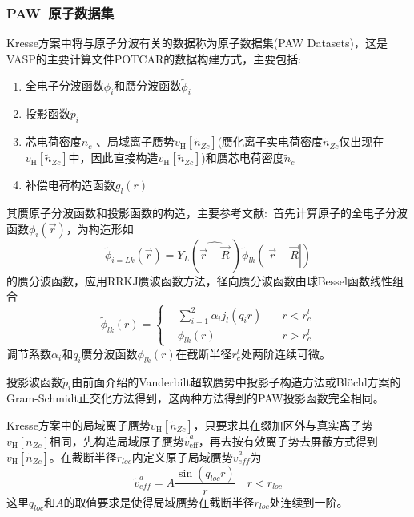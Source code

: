 \subsubsection{\rm{PAW~}原子数据集}
\textrm{Kresse}方案中将与原子分波有关的数据称为原子数据集(\textrm{PAW Datasets})，这是\textrm{VASP}的主要计算文件\textrm{POTCAR}的数据构建方式，主要包括:~
\begin{enumerate}
	\item 全电子分波函数$\phi_i$和赝分波函数$\tilde\phi_i$
	\item 投影函数$\tilde p_i$
	\item 芯电荷密度$n_c$ 、局域离子赝势$v_{\mathrm H}[\tilde n_{Zc}]$(赝化离子实电荷密度$\tilde n_{Zc}$仅出现在$v_{\mathrm H}[\tilde n_{Zc}]$中，因此直接构造$v_{\mathrm H}[\tilde n_{Zc}]$)和赝芯电荷密度$\tilde n_c$
	\item 补偿电荷构造函数$g_l(r)$
\end{enumerate}

其赝原子分波函数和投影函数的构造，主要参考文献\cite{JPCM6-8245_1994}:~首先计算原子的全电子分波函数$\phi_i(\vec r)$，为构造形如
	\begin{equation}
		\tilde\phi_{i=Lk}(\vec r)=Y_L(\widehat{\vec r-\vec R}~)\tilde\phi_{lk}(|\vec r-\vec R|)
	\end{equation}
	的赝分波函数，应用\textrm{RRKJ}赝波函数方法，径向赝分波函数由球\textrm{Bessel}函数线性组合
	\begin{equation}
		\tilde\phi_{lk}(r)=\left\{
		\begin{aligned}
			&\sum_{i=1}^2\alpha_ij_l(q_ir)\quad &r<r_c^l\\
			&\phi_{lk}(r)\quad&r>r_c^l
		\end{aligned}
		\right.
	\end{equation}
调节系数$\alpha_i$和$q_i$赝分波函数$\phi_{lk}(r)$在截断半径$r_c^l$处两阶连续可微。

投影波函数$\tilde p_i$由前面介绍的\textrm{Vanderbilt}超软赝势中投影子构造方法或\textrm{Bl\"ochl}方案的\textrm{Gram-Schmidt}正交化方法得到，这两种方法得到的\textrm{PAW}投影函数完全相同。

\textrm{Kresse}方案中的局域离子赝势$v_{\mathrm H}[\tilde n_{Zc}]$，只要求其在缀加区外与真实离子势$v_{\mathrm H}[n_{Zc}]$相同，先构造局域原子赝势$\tilde v_{\mathrm{eff}}^a$，再去按有效离子势去屏蔽方式得到$v_{\mathrm H}[\tilde n_{Zc}]$。在截断半径$r_{loc}$内定义原子局域赝势$\tilde v_{eff}^a$为
$$\tilde v_{eff}^a=A\dfrac{\sin(q_{loc}r)}r\quad r<r_{loc}$$
这里$q_{loc}$和$A$的取值要求是使得局域赝势在截断半径$r_{loc}$处连续到一阶。

